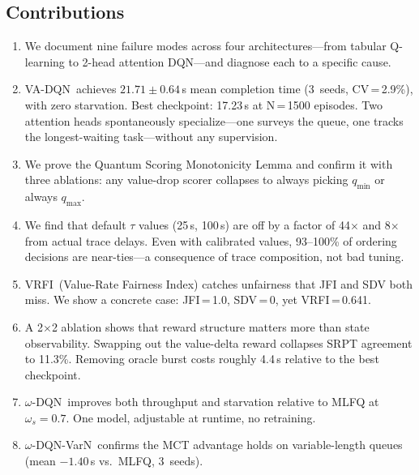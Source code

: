 \documentclass[10pt,twocolumn]{article}
\theoremstyle{remark}
\newcommand{\vrfi}{\textsc{VRFI}}
\newcommand{\vadqn}{VA-DQN}
\newcommand{\omegadqn}{$\omega$-DQN}
\newcommand{\omegavarn}{$\omega$-DQN-VarN}
\begin{document}
\subsection*{Contributions}

\begin{enumerate}[leftmargin=*, label=\arabic*., itemsep=2pt]

\item We document nine failure modes across four architectures---from
  tabular Q-learning to 2-head attention DQN---and diagnose each to
  a specific cause.

\item \vadqn\ achieves $21.71\pm0.64$\,s mean completion time
  (3~seeds, CV\,=\,2.9\%), with zero starvation. Best checkpoint:
  17.23\,s at N\,=\,1500 episodes. Two attention heads
  spontaneously specialize---one surveys the queue, one tracks the
  longest-waiting task---without any supervision.

\item We prove the Quantum Scoring Monotonicity Lemma and confirm it
  with three ablations: any value-drop scorer collapses to always
  picking $q_{\min}$ or always $q_{\max}$.

\item We find that default $\tau$ values (25\,s, 100\,s) are off by
  a factor of 44$\times$ and 8$\times$ from actual trace delays.
  Even with calibrated values, 93--100\% of ordering decisions are
  near-ties---a consequence of trace composition, not bad tuning.

\item \vrfi\ (Value-Rate Fairness Index) catches unfairness that JFI
  and SDV both miss. We show a concrete case: JFI\,=\,1.0,
  SDV\,=\,0, yet \vrfi\,=\,0.641.

\item A 2$\times$2 ablation shows that reward structure matters more
  than state observability. Swapping out the value-delta reward
  collapses SRPT agreement to 11.3\%. Removing oracle burst costs
  roughly 4.4\,s relative to the best checkpoint.

\item \omegadqn\ improves both throughput and starvation relative to
  MLFQ at $\omega_s=0.7$. One model, adjustable at runtime, no
  retraining.

\item \omegavarn\ confirms the MCT advantage holds on variable-length
  queues (mean $-1.40$\,s vs.\ MLFQ, 3~seeds).

\end{enumerate}
\end{document}

